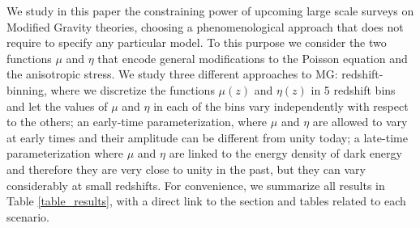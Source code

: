 We study in this paper the constraining power of upcoming large scale surveys on Modified Gravity theories, choosing a phenomenological approach that does not require to specify any particular model. To this purpose we consider the two functions $\mu$ and $\eta$ that encode general modifications to the Poisson equation and the anisotropic stress.
We study three different approaches to MG: redshift-binning, where we discretize the functions $\mu(z)$ and $\eta(z)$ in 5 redshift bins and 
let the values of $\mu$ and $\eta$ in each of the bins vary independently with respect to the others; an early-time parameterization, where $\mu$ and $\eta$ are allowed to vary at early times and their amplitude
can be different from unity today; a late-time parameterization where  $\mu$ and $\eta$ are linked to the energy density of dark energy and therefore they are very
close to unity in the past, but they can vary considerably at small redshifts. For convenience, we summarize all results in Table \ref{table_results}, with a direct link to the section and tables related to each scenario.



